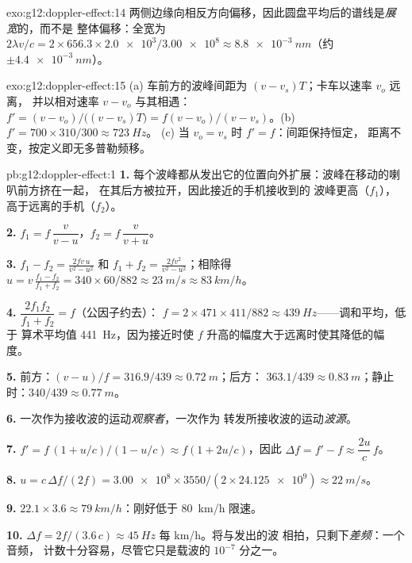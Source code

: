 \begin{solution}{exo:g12:doppler-effect:14}
两侧边缘向相反方向偏移，因此圆盘平均后的谱线是\emph{展宽}的，而不是
整体偏移：全宽为 $2\lambda v/c = 2 \times 656.3 \times \num{2.0e3}/\num{3.00e8}
\approx \qty{8.8e-3}{nm}$（约 $\pm\qty{4.4e-3}{nm}$）。
\end{solution}

\begin{solution}{exo:g12:doppler-effect:15}
(a) 车前方的波峰间距为 $(v - v_s)T$；卡车以速率 $v_o$ 远离，
并以相对速率 $v - v_o$ 与其相遇：$f' = (v - v_o)/\bigl((v - v_s)T\bigr) =
f(v - v_o)/(v - v_s)$。(b) $f' = 700 \times 310/300 \approx \qty{723}{Hz}$。
(c) 当 $v_o = v_s$ 时 $f' = f$：间距保持恒定，
距离不变，按定义即无多普勒频移。
\end{solution}

\begin{solution}{pb:g12:doppler-effect:1}
\textbf{1.} 每个波峰都从发出它的位置向外扩展：波峰在移动的喇叭前方挤在一起，
在其后方被拉开，因此接近的手机接收到的
波峰更高（$f_1$），高于远离的手机（$f_2$）。

\textbf{2.} $f_1 = f\,\dfrac{v}{v - u}$，\quad $f_2 = f\,\dfrac{v}{v + u}$。

\textbf{3.} $f_1 - f_2 = \frac{2fv\,u}{v^2 - u^2}$ 和 $f_1 + f_2 =
\frac{2fv^2}{v^2 - u^2}$；相除得 $u = v\,\frac{f_1 - f_2}{f_1 + f_2} =
340 \times 60/882 \approx \qty{23}{m/s} \approx \qty{83}{km/h}$。

\textbf{4.} $\dfrac{2f_1 f_2}{f_1 + f_2} = f$（公因子约去）：
$f = 2 \times 471 \times 411/882 \approx \qty{439}{Hz}$——调和平均，低于
算术平均值 \qty{441}{Hz}，因为接近时使 $f$ 升高的幅度大于远离时使其降低的幅度。

\textbf{5.} 前方：$(v - u)/f = 316.9/439 \approx \qty{0.72}{m}$；后方：
$363.1/439 \approx \qty{0.83}{m}$；静止时：$340/439 \approx \qty{0.77}{m}$。

\textbf{6.} 一次作为接收波的运动\emph{观察者}，一次作为
转发所接收波的运动\emph{波源}。

\textbf{7.} $f' = f\,(1 + u/c)/(1 - u/c) \approx f(1 + 2u/c)$，因此
$\Delta f = f' - f \approx \dfrac{2u}{c}\,f$。

\textbf{8.} $u = c\,\Delta f/(2f) = \num{3.00e8} \times 3550/(2 \times \num{24.125e9})
\approx \qty{22}{m/s}$。

\textbf{9.} $22.1 \times 3.6 \approx \qty{79}{km/h}$：刚好低于 \qty{80}{km/h}
限速。

\textbf{10.} $\Delta f = 2f/(3.6\,c) \approx \qty{45}{Hz}$ 每 \unit{km/h}。将与发出的波
相拍，只剩下\emph{差频}：一个音频，
计数十分容易，尽管它只是载波的 $10^{-7}$ 分之一。


\end{solution}
